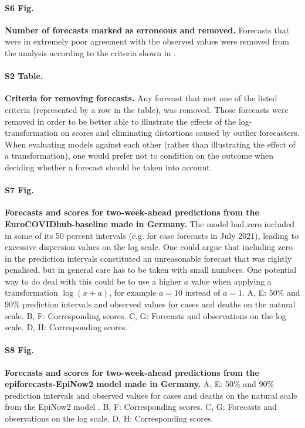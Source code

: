 \documentclass[10pt,letterpaper]{article}
\begin{document}
\paragraph{S6 Fig.}
\label{fig:erroneous-forecasts}
\textbf{Number of forecasts marked as erroneous and removed. } 
Forecasts that were in extremely poor agreement with the observed values were removed from the analysis according to the criteria shown in . 

\paragraph{S2 Table.}
\label{tab:erroneous}
\textbf{Criteria for removing forecasts. }
Any forecast that met one of the listed criteria (represented by a row in the table), was removed. Those forecasts were removed in order to be better able to illustrate the effects of the log-transformation on scores and eliminating distortions caused by outlier forecasters. When evaluating models against each other (rather than illustrating the effect of a transformation), one would prefer not to condition on the outcome when deciding whether a forecast should be taken into account. 

\paragraph{S7 Fig.}
\label{fig:HUB-model-comparison-baseline}
\textbf{Forecasts and scores for two-week-ahead predictions from the EuroCOVIDhub-baseline made in Germany. }
The model had zero included in some of its 50 percent intervals (e.g. for case forecasts in July 2021), leading to excessive dispersion values on the log scale. One could argue that including zero in the prediction intervals constituted an unreasonable forecast that was rightly penalised, but in general care has to be taken with small numbers. One potential way to do deal with this could be to use a higher $a$ value when applying a transformation $\log(x + a)$, for example $a = 10$ instead of $a = 1$. A, E: 50\% and 90\% prediction intervals and observed values for cases and deaths on the natural scale. B, F: Corresponding scores. C, G: Forecasts and observations on the log scale. D, H: Corresponding scores. 
    
\paragraph{S8 Fig.}
\label{fig:HUB-model-comparison-epinow}
\textbf{Forecasts and scores for two-week-ahead predictions from the epiforecasts-EpiNow2 model made in Germany.} 
A, E: 50\% and 90\% prediction intervals and observed values for cases and deaths on the natural scale from the EpiNow2 model \cite{epinow2}. B, F: Corresponding scores. C, G: Forecasts and observations on the log scale. D, H: Corresponding scores. 


\clearpage

\end{document}
